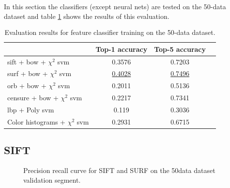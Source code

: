 In this section the classifiers {(except neural nets)} are tested on the 50-data dataset and table \ref{tab:results} shows the results of this evaluation.

\begin{table}[htbp]
	\centering
	\caption{Evaluation results for feature classifier training on the 50-data dataset.}
	\label{tab:results}
	\begin{tabular}{lccc}
		\hline
		\multicolumn{1}{c}{} 					& Top-1 accuracy  & Top-5 accuracy 	\\ \hline
		\gls{sift} + \gls{bow} + $\chi^2$ \gls{svm}	& 0.3576	 		  & 0.7203			\\ 
		\gls{surf} + \gls{bow} + $\chi^2$ \gls{svm}	& \underline{0.4028}	 		  & \underline{0.7496}			\\ 
		\gls{orb} +  \gls{bow} + $\chi^2$ \gls{svm}	& 0.2011	 		  & 0.5136			\\
		\gls{censure} + \gls{bow} + $\chi^2$ \gls{svm}	& 0.2217	 	  & 0.7341			\\ 
		\gls{lbp} + Poly \gls{svm}					& 0.119	 		  & 0.3036			\\ 
		Color histograms + $\chi^2$ \gls{svm}		& 0.2931		  & 0.6715			\\ \hline
	\end{tabular}
\end{table}


\subsection{SIFT}
\begin{figure}[htbp]
	\centering
	\caption{Precision recall curve for SIFT and SURF on the 50data dataset validation segment.}
	\label{fig:results_SIFTSURFroc}
\end{figure}

